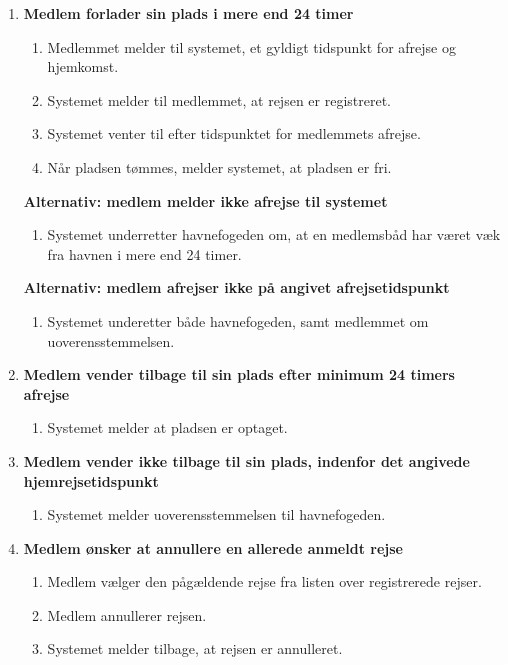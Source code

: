   \begin{enumerate}

    \item{\textbf{Medlem forlader sin plads i mere end 24 timer}}
      \begin{enumerate}
        \item Medlemmet melder til systemet, et gyldigt tidspunkt for afrejse og hjemkomst.
        \item Systemet melder til medlemmet, at rejsen er registreret.
        \item Systemet venter til efter tidspunktet for medlemmets afrejse.
        \item Når pladsen tømmes, melder systemet, at pladsen er fri.
      \end{enumerate}

    \textbf{Alternativ: medlem melder ikke afrejse til systemet}
      \begin{enumerate}
        \item Systemet underretter havnefogeden om, at en medlemsbåd har været væk fra havnen i mere end 24 timer.
      \end{enumerate}

    \textbf{Alternativ: medlem afrejser ikke på angivet afrejsetidspunkt}
      \begin{enumerate}
        \item Systemet underetter både havnefogeden, samt medlemmet om uoverensstemmelsen.
      \end{enumerate}

    \item{\textbf{Medlem vender tilbage til sin plads efter minimum 24 timers afrejse}}
      \begin{enumerate}
        \item Systemet melder at pladsen er optaget.
      \end{enumerate}

    \item{\textbf{Medlem vender ikke tilbage til sin plads, indenfor det angivede hjemrejsetidspunkt}}
      \begin{enumerate}
        \item Systemet melder uoverensstemmelsen til havnefogeden.
      \end{enumerate}

    \item{\textbf{Medlem ønsker at annullere en allerede anmeldt rejse}}
      \begin{enumerate}
        \item Medlem vælger den pågældende rejse fra listen over registrerede rejser.
        \item Medlem annullerer rejsen.
        \item Systemet melder tilbage, at rejsen er annulleret.
      \end{enumerate}
	  

\end{enumerate}

